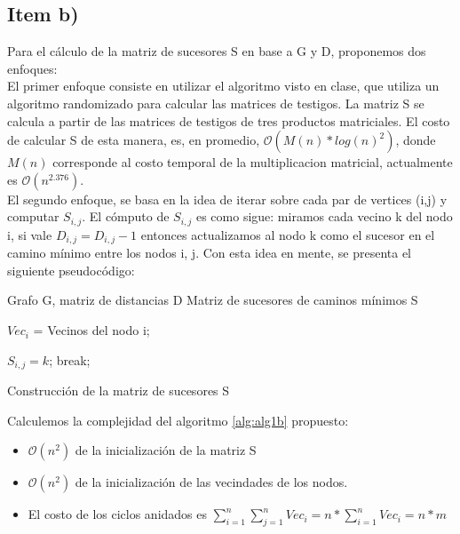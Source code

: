 \documentclass[10pt,a4paper]{article}
\begin{document}
\subsection{Item b)}

Para el cálculo de la matriz de sucesores S en base a G y D, proponemos dos enfoques:\\
El primer enfoque consiste en utilizar el algoritmo visto en clase, que utiliza un algoritmo randomizado para calcular las matrices de testigos. La matriz S se calcula a partir de las matrices de testigos de tres productos matriciales. El costo de calcular S de esta manera, es, en promedio, $\mathcal{O}(M(n) * log(n)^2)$, donde $M(n)$ corresponde al costo temporal de la multiplicacion matricial, actualmente es $\mathcal{O}(n^{2.376})$.\\
\newline
El segundo enfoque, se basa en la idea de iterar sobre cada par de vertices (i,j) y computar $S_{i,j}$. El cómputo de $S_{i,j}$ es como sigue: miramos cada vecino k del nodo i, si vale $D_{i,j} = D_{i,j} - 1$ entonces actualizamos al nodo k como el sucesor en el camino mínimo entre los nodos i, j. Con esta idea en mente, se presenta el siguiente pseudocódigo:

\begin{algorithm}[H]
	\begin{algorithmic}[1]
		\REQUIRE Grafo G, matriz de distancias D
		\ENSURE Matriz de sucesores de caminos mínimos S
		
    	    \STATE $Vec_i$ = Vecinos del nodo i;
	    \ENDFOR
		
    		            \STATE $S_{i,j} = k$;
    		            \STATE break;
    		        \ENDIF
    		    \ENDFOR
    		\ENDFOR
		\ENDFOR
		
	\end{algorithmic}
	\caption{Construcción de la matriz de sucesores S}\label{alg:alg1b}
\end{algorithm}

Calculemos la complejidad del algoritmo \ref{alg:alg1b} propuesto:
\begin{itemize}
    \item $\mathcal{O}(n^2)$ de la inicialización de la matriz S
    \item $\mathcal{O}(n^2)$ de la inicialización de las vecindades de los nodos.
    \item El costo de los ciclos anidados es $\displaystyle\sum_{i=1}^{n} \sum_{j=1}^{n} Vec_i = n*\sum_{i=1}^{n} Vec_i = n*m $
\end{itemize}
\end{document}
